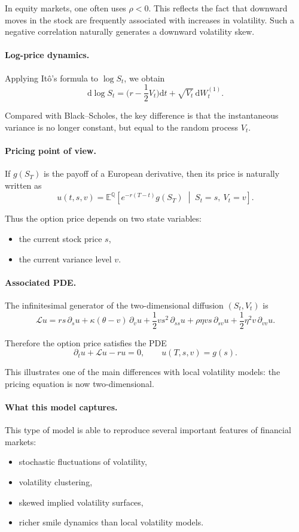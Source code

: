 \documentclass[11pt]{article}
\newcommand{\Qbb}{\mathbb{Q}}
\newcommand{\E}{\mathbb{E}}
\theoremstyle{plain}
\theoremstyle{definition}
\theoremstyle{remark}
\begin{document}
In equity markets, one often uses \(\rho<0\).
This reflects the fact that downward moves in the stock are frequently
associated with increases in volatility.
Such a negative correlation naturally generates a downward volatility
skew.

\paragraph{Log-price dynamics.}
Applying It\^o's formula to \(\log S_t\), we obtain
\[
\mathrm{d}\log S_t
=
\Big(r-\frac12 V_t\Big)\mathrm{d}t
+
\sqrt{V_t}\,\mathrm{d}W_t^{(1)}.
\]

Compared with Black--Scholes, the key difference is that the
instantaneous variance is no longer constant, but equal to the random
process \(V_t\).

\paragraph{Pricing point of view.}
If \(g(S_T)\) is the payoff of a European derivative, then its price is
naturally written as
\[
u(t,s,v)
=
\E^\Qbb\!\left[
e^{-r(T-t)}g(S_T)
\;\middle|\;
S_t=s,\ V_t=v
\right].
\]

Thus the option price depends on two state variables:
\begin{itemize}[leftmargin=1.4em]
    \item the current stock price \(s\),
    \item the current variance level \(v\).
\end{itemize}

\paragraph{Associated PDE.}
The infinitesimal generator of the two-dimensional diffusion
\((S_t,V_t)\) is
\[
\mathcal L u
=
rs\,\partial_s u
+
\kappa(\theta-v)\,\partial_v u
+
\frac12 vs^2\,\partial_{ss}u
+
\rho\eta vs\,\partial_{sv}u
+
\frac12\eta^2 v\,\partial_{vv}u.
\]

Therefore the option price satisfies the PDE
\[
\partial_t u+\mathcal L u-r u=0,
\qquad
u(T,s,v)=g(s).
\]

This illustrates one of the main differences with local volatility
models: the pricing equation is now two-dimensional.

\paragraph{What this model captures.}
This type of model is able to reproduce several important features of
financial markets:
\begin{itemize}[leftmargin=1.4em]
    \item stochastic fluctuations of volatility,
    \item volatility clustering,
    \item skewed implied volatility surfaces,
    \item richer smile dynamics than local volatility models.
\end{itemize}
\end{document}
